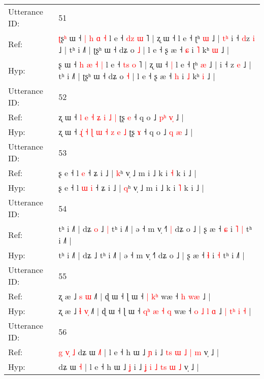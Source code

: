 \documentclass[10pt]{article}
\DeclareRobustCommand{\hl}[1]{{\textcolor{red}{#1}}}
\begin{document}
\begin{longtable}{ll}
Utterance ID: & 51 \\
Ref: & \hl{ʈ}ʂ\hl{ʰ} ɯ ˧ \hl{|} \hl{h} \hl{ɑ} \hl{˧} l e ˧ \hl{d}\hl{z} \hl{ɯ} ˥ | ʐ ɯ ˧\hl{}\hl{} l e ˧ ʈʰ \hl{ɯ} ˩ |\hl{ }\hl{t}\hl{ʰ} i ˧ \hl{d}z \hl{i} ˩ | tʰ i ˩˥ | ʈʂʰ ɯ ˧ dʑ o \hl{˩} | l e ˧ ʂ æ ˧ \hl{ɕ} i \hl{˥} kʰ \hl{ɯ} ˩ |
 \\
Hyp: & \hl{}ʂ\hl{} ɯ ˧ \hl{h} \hl{æ} \hl{˧} \hl{|} l e ˧ \hl{t}\hl{s} \hl{o} ˥ | ʐ ɯ ˧\hl{ }\hl{|} l e ˧ ʈʰ \hl{æ} ˩ |\hl{}\hl{}\hl{} i ˧ \hl{}z \hl{e} ˩ | tʰ i ˩˥ | ʈʂʰ ɯ ˧ dʑ o \hl{˧} | l e ˧ ʂ æ ˧ \hl{h} i \hl{˩} kʰ \hl{i} ˩ |
 \\
\midrule
Utterance ID: & 52 \\
Ref: & ʐ ɯ ˧\hl{}\hl{}\hl{} \hl{l} \hl{e} \hl{˧} \hl{ʑ} \hl{i} \hl{˩} \hl{|} ʈʂ \hl{e} ˧ q o ˩ \hl{p}\hl{ʰ} \hl{v}\hl{̩} ˩ |
 \\
Hyp: & ʐ ɯ ˧\hl{ }\hl{ɻ}\hl{̍} \hl{˧} \hl{ɭ} \hl{ɯ} \hl{˧} \hl{z} \hl{e} \hl{˩} ʈʂ \hl{ɤ} ˧ q o ˩ \hl{}\hl{q} \hl{}\hl{æ} ˩ |
 \\
\midrule
Utterance ID: & 53 \\
Ref: & ʂ e ˧ l\hl{}\hl{} \hl{e} ˧ ʑ i ˩ | \hl{k}ʰ v̩ ˩ m i ˩ k i \hl{˧} k i ˩ |
 \\
Hyp: & ʂ e ˧ l\hl{ }\hl{ɯ} \hl{i} ˧ ʑ i ˩ | \hl{q}ʰ v̩ ˩ m i ˩ k i \hl{˥} k i ˩ |
 \\
\midrule
Utterance ID: & 54 \\
Ref: & tʰ i ˩˥ | dʑ\hl{ }\hl{o} ˩\hl{ }\hl{|} tʰ i ˩˥ | ə ˧ m v̩ ˧˥\hl{ }\hl{|} dʑ o ˩ | ʂ æ ˧ \hl{ɕ} i\hl{ }\hl{˥} \hl{|} tʰ i ˩˥ |
 \\
Hyp: & tʰ i ˩˥ | dʑ\hl{}\hl{} ˩\hl{}\hl{} tʰ i ˩˥ | ə ˧ m v̩ ˧˥\hl{}\hl{} dʑ o ˩ | ʂ æ ˧ \hl{ɬ} i\hl{}\hl{} \hl{˧} tʰ i ˩˥ |
 \\
\midrule
Utterance ID: & 55 \\
Ref: & ʐ æ ˩ \hl{s} \hl{}\hl{ɯ} ˩˥ | ɖ ɯ ˧ ɭ ɯ ˧\hl{}\hl{}\hl{} \hl{|} \hl{}\hl{k}\hl{ʰ} wæ ˧\hl{}\hl{} \hl{h} \hl{}\hl{w}\hl{æ} ˩\hl{}\hl{}\hl{}\hl{}\hl{}\hl{}\hl{}\hl{}\hl{} |
 \\
Hyp: & ʐ æ ˩ \hl{ɬ} \hl{v}\hl{̩} ˩˥ | ɖ ɯ ˧ ɭ ɯ ˧\hl{ }\hl{q}\hl{ʰ} \hl{æ} \hl{˧}\hl{ }\hl{q} wæ ˧\hl{ }\hl{o} \hl{˩} \hl{l}\hl{ }\hl{ɑ} ˩\hl{ }\hl{|}\hl{ }\hl{t}\hl{ʰ}\hl{ }\hl{i}\hl{ }\hl{˧} |
 \\
\midrule
Utterance ID: & 56 \\
Ref: & \hl{g}\hl{ }\hl{v}\hl{̩}\hl{ }\hl{˩}\hl{ }dʑ ɯ \hl{˩}\hl{˥} | l e ˧ h ɯ ˩ \hl{ɲ} i ˩ \hl{}\hl{t}\hl{s} \hl{ɯ} \hl{}\hl{˩} \hl{|} \hl{m} v̩ ˩ |
 \\
Hyp: & \hl{}\hl{}\hl{}\hl{}\hl{}\hl{}\hl{}dʑ ɯ \hl{}\hl{˧} | l e ˧ h ɯ ˩ \hl{ʝ} i ˩ \hl{ʝ}\hl{ }\hl{i} \hl{˩} \hl{t}\hl{s} \hl{ɯ} \hl{˩} v̩ ˩ |

\end{longtable}
\end{document}
